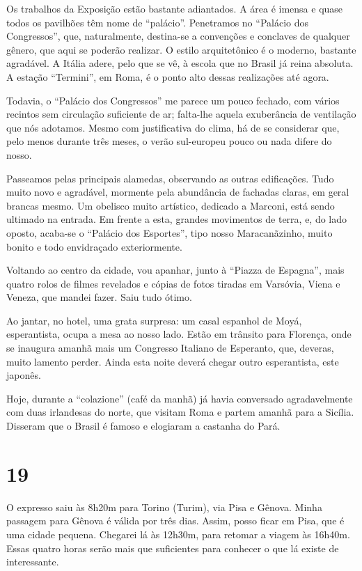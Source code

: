 Os trabalhos da Exposição estão bastante adiantados. A área é imensa e quase todos os pavilhões têm nome de ``palácio''. Penetramos no ``Palácio dos Congressos'', que, naturalmente, destina-se a convenções e conclaves de qualquer gênero, que aqui se poderão realizar. O estilo arquitetônico é o moderno, bastante agradável. A Itália adere, pelo que se vê, à escola que no Brasil já reina absoluta. A estação ``Termini'', em Roma, é o ponto alto dessas realizações até agora.

Todavia, o ``Palácio dos Congressos'' me parece um pouco fechado, com vários recintos sem circulação suficiente de ar; falta-lhe aquela exuberância de ventilação que nós adotamos. Mesmo com justificativa do clima, há de se considerar que, pelo menos durante três meses, o verão sul-europeu pouco ou nada difere do nosso.

Passeamos pelas principais alamedas, observando as outras edificações. Tudo muito novo e agradável, mormente pela abundância de fachadas claras, em geral brancas mesmo. Um obelisco muito artístico, dedicado a Marconi, está sendo ultimado na entrada. Em frente a esta, grandes movimentos de terra, e, do lado oposto, acaba-se o ``Palácio dos Esportes'', tipo nosso Maracanãzinho, muito bonito e todo envidraçado exteriormente.

Voltando ao centro da cidade, vou apanhar, junto à ``Piazza de Espagna'', mais quatro rolos de filmes revelados e cópias de fotos tiradas em Varsóvia, Viena e Veneza, que mandei fazer. Saiu tudo ótimo.

Ao jantar, no hotel, uma grata surpresa: um casal espanhol de Moyá, esperantista, ocupa a mesa ao nosso lado. Estão em trânsito para Florença, onde se inaugura amanhã mais um Congresso Italiano de Esperanto, que, deveras, muito lamento perder. Ainda esta noite deverá chegar outro esperantista, este japonês.

Hoje, durante a ``colazione'' (café da manhã) já havia conversado agradavelmente com duas irlandesas do norte, que visitam Roma e partem amanhã para a Sicília. Disseram que o Brasil é famoso e elogiaram a castanha do Pará.

\section*{19 \adfflatleafright {}}
O expresso saiu às 8h20m para Torino (Turim), via Pisa e Gênova. Minha passagem para Gênova é válida por três dias. Assim, posso ficar em Pisa, que é uma cidade pequena. Chegarei lá às 12h30m, para retomar a viagem às 16h40m. Essas quatro horas serão mais que suficientes para conhecer o que lá existe de interessante.

